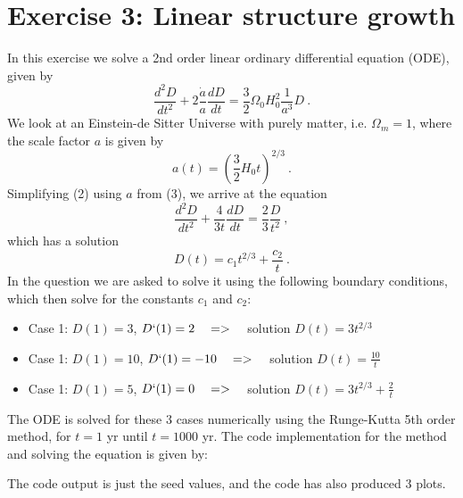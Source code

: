 \documentclass{article}
\begin{document}
\section{Exercise 3: Linear structure growth}
In this exercise we solve a 2nd order linear ordinary differential equation (ODE), given by
\begin{equation}
    \frac{d^2 D}{dt^2}+2\frac{\dot{a}}{a}\frac{dD}{dt} = \frac{3}{2}\Omega_0 H_0^2\frac{1}{a^3}D \ .
\end{equation}
We look at an Einstein-de Sitter Universe with purely matter, i.e. $\Omega_m=1$, where the scale factor $a$ is given by
\begin{equation}
    a(t) = \left(\frac{3}{2}H_0 t\right)^{2/3} \ .
\end{equation}
Simplifying (2) using $a$ from (3), we arrive at the equation
\begin{equation}
    \frac{d^2 D}{dt^2} + \frac{4}{3t}\frac{dD}{dt} = \frac{2}{3}\frac{D}{t^2} \ , 
\end{equation}
which has a solution 
\begin{equation}
    D(t) = c_1 t^{2/3} + \frac{c_2}{t} \ .
\end{equation}
In the question we are asked to solve it using the following boundary conditions, which then solve for the constants $c_1$ and $c_2$:
\begin{itemize}
    \item Case 1: $D(1) = 3$, $D`(1) = 2 \quad => \quad$ solution $D(t) = 3t^{2/3}$ 
    \item Case 1: $D(1) = 10$, $D`(1) = -10 \quad => \quad$ solution $D(t) = \frac{10}{t}$ 
    \item Case 1: $D(1) = 5$, $D`(1) = 0 \quad => \quad$ solution $D(t) = 3t^{2/3} + \frac{2}{t}$ 
\end{itemize}

The ODE is solved for these 3 cases numerically using the Runge-Kutta 5th order method, for $t = 1$ yr until $t = 1000$ yr. The code implementation for the method and solving the equation is given by:


The code output is just the seed values, and the code has also produced 3 plots.

\end{document}
